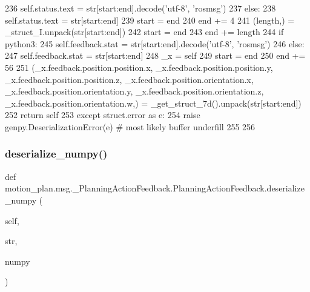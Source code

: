 \begin{DoxyCode}
236         self.status.text = str[start:end].decode(\textcolor{stringliteral}{'utf-8'}, \textcolor{stringliteral}{'rosmsg'})
237       \textcolor{keywordflow}{else}:
238         self.status.text = str[start:end]
239       start = end
240       end += 4
241       (length,) = \_struct\_I.unpack(str[start:end])
242       start = end
243       end += length
244       \textcolor{keywordflow}{if} python3:
245         self.feedback.stat = str[start:end].decode(\textcolor{stringliteral}{'utf-8'}, \textcolor{stringliteral}{'rosmsg'})
246       \textcolor{keywordflow}{else}:
247         self.feedback.stat = str[start:end]
248       \_x = self
249       start = end
250       end += 56
251       (\_x.feedback.position.position.x, \_x.feedback.position.position.y, \_x.feedback.position.position.z, 
      \_x.feedback.position.orientation.x, \_x.feedback.position.orientation.y, \_x.feedback.position.orientation.z, 
      \_x.feedback.position.orientation.w,) = \_get\_struct\_7d().unpack(str[start:end])
252       \textcolor{keywordflow}{return} self
253     \textcolor{keywordflow}{except} struct.error \textcolor{keyword}{as} e:
254       \textcolor{keywordflow}{raise} genpy.DeserializationError(e)  \textcolor{comment}{# most likely buffer underfill}
255 
256 
\end{DoxyCode}
\mbox{\label{classmotion__plan_1_1msg_1_1__PlanningActionFeedback_1_1PlanningActionFeedback_a613cddba52c6da279c68e8c988f888db}} 
\subsubsection{\texorpdfstring{deserialize\+\_\+numpy()}{deserialize\_numpy()}}
{\footnotesize\ttfamily def motion\+\_\+plan.\+msg.\+\_\+\+Planning\+Action\+Feedback.\+Planning\+Action\+Feedback.\+deserialize\+\_\+numpy (\begin{DoxyParamCaption}\item[{}]{self,  }\item[{}]{str,  }\item[{}]{numpy }\end{DoxyParamCaption})}

